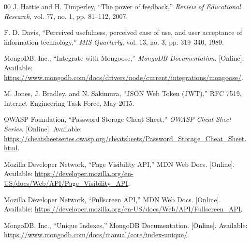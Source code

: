 \documentclass[conference]{IEEEtran}
\begin{document}
\begin{thebibliography}{00}
J. Hattie and H. Timperley,
``The power of feedback,''
\emph{Review of Educational Research}, vol. 77, no. 1,
pp. 81--112, 2007.

F. D. Davis,
``Perceived usefulness, perceived ease of use, and user acceptance of
information technology,''
\emph{MIS Quarterly}, vol. 13, no. 3, pp. 319--340, 1989.

MongoDB, Inc.,
``Integrate with Mongoose,''
\emph{MongoDB Documentation}. [Online]. Available:
\url{https://www.mongodb.com/docs/drivers/node/current/integrations/mongoose/}.

M. Jones, J. Bradley, and N. Sakimura,
``JSON Web Token (JWT),''
RFC 7519, Internet Engineering Task Force, May 2015.

OWASP Foundation,
``Password Storage Cheat Sheet,''
\emph{OWASP Cheat Sheet Series}. [Online]. Available:
\url{https://cheatsheetseries.owasp.org/cheatsheets/Password_Storage_Cheat_Sheet.html}.

Mozilla Developer Network,
``Page Visibility API,''
MDN Web Docs. [Online]. Available:
\url{https://developer.mozilla.org/en-US/docs/Web/API/Page_Visibility_API}.

Mozilla Developer Network,
``Fullscreen API,''
MDN Web Docs. [Online]. Available:
\url{https://developer.mozilla.org/en-US/docs/Web/API/Fullscreen_API}.

MongoDB, Inc.,
``Unique Indexes,''
MongoDB Documentation. [Online]. Available:
\url{https://www.mongodb.com/docs/manual/core/index-unique/}.

\end{thebibliography}
\end{document}
